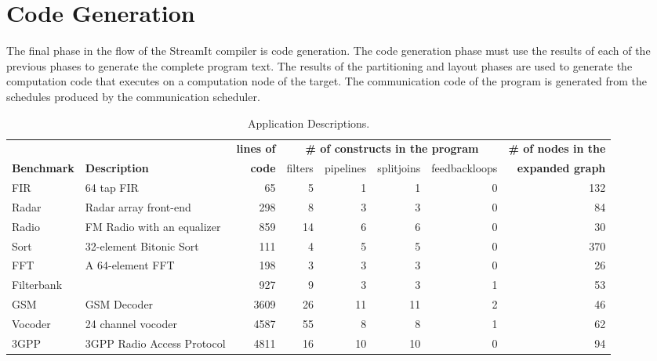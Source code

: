 \section{Code Generation}
\label{sec:codegen}

The final phase in the flow of the StreamIt compiler is code
generation.  The code generation phase must use the results of each of
the previous phases to generate the complete program text.  The
results of the partitioning and layout phases are used to generate the
computation code that executes on a computation node of the target.
The communication code of the program is generated from the schedules
produced by the communication scheduler.

\begin{table*}[t]
\begin{center}
\scriptsize
\begin{tabular}{|l|l||r||r|r|r|r||r|} \hline
 & & {\bf lines of} & \multicolumn{4}{|c||}{\bf \# of constructs in the program} & {\bf \# of nodes in the} \\ \cline{4-7}
{\bf Benchmark} & {\bf Description} & {\bf code} & filters & pipelines & splitjoins & feedbackloops & {\bf expanded graph}
\\
\hline \hline
FIR & 64 tap FIR & 
65 & 5 & 1 & 1 & 0 & 132
\\ \hline
Radar & Radar array front-end\cite{pca} & 
298 & 8 & 3 & 3 & 0 & 84
\\ \hline
Radio & FM Radio with an equalizer & 
859 & 14 & 6 & 6 & 0 & 30
\\ \hline
Sort & 32-element Bitonic Sort & 
111 & 4 & 5 & 5 & 0 & 370
\\  \hline
FFT & A 64-element FFT & 
198 & 3 & 3 & 3 & 0 & 26
\\  \hline
Filterbank & & 
927 & 9 & 3 & 3 & 1 & 53
\\  \hline
GSM & GSM Decoder & 
3609 & 26 & 11 & 11 & 2 & 46
\\ \hline
Vocoder & 24 channel vocoder &  
4587 & 55 & 8 & 8 & 1 & 62
\\ \hline
3GPP & 3GPP Radio Access Protocol &  
4811 & 16 & 10 & 10 & 0 & 94
\\ \hline
\hline
\end{tabular}
\vspace{-6pt}
\caption{\protect\small Application Descriptions.}
\label{tab:benchmarks}
\vspace{-12pt}
\end{center}
\end{table*}

